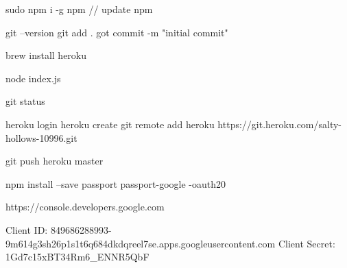 sudo npm i -g npm  // update npm


git --version
git add .
got commit -m "initial commit"

brew install heroku

node index.js

git status

heroku login
heroku create
git remote add heroku https://git.heroku.com/salty-hollows-10996.git


git push heroku master

npm install --save passport passport-google -oauth20

https://console.developers.google.com

Client ID: 849686288993-9m614g3sh26p1s1t6q684dkdqreel7se.apps.googleusercontent.com
Client Secret: 1Gd7c15xBT34Rm6_ENNR5QbF